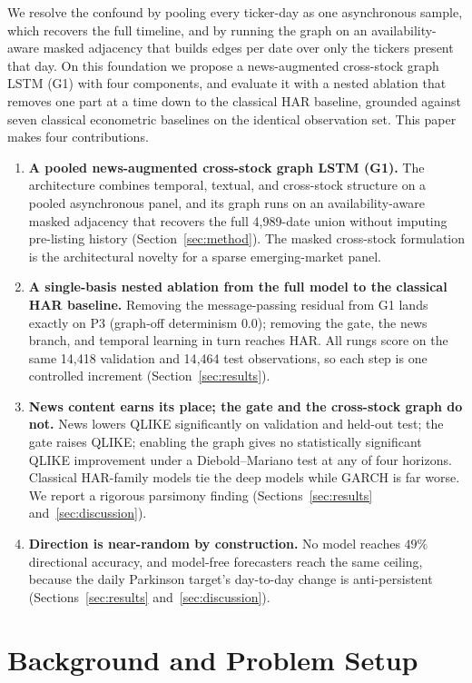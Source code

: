 \documentclass[runningheads]{llncs}
\newcommand{\nval}{14{,}418}
\newcommand{\ntest}{14{,}464}
\begin{document}
We resolve the confound by pooling every ticker-day as one asynchronous sample, which recovers the full
timeline, and by running the graph on an availability-aware masked adjacency that builds edges per date
over only the tickers present that day. On this foundation we propose a news-augmented cross-stock graph
LSTM (G1) with four components, and evaluate it with a nested ablation that removes one part at a time
down to the classical HAR baseline, grounded against seven classical econometric baselines on the
identical observation set. This paper makes four contributions.
\begin{enumerate}
\item \textbf{A pooled news-augmented cross-stock graph LSTM (G1).} The architecture combines temporal,
textual, and cross-stock structure on a pooled asynchronous panel, and its graph runs on an
availability-aware masked adjacency that recovers the full 4{,}989-date union without imputing
pre-listing history (Section~\ref{sec:method}). The masked cross-stock formulation is the architectural
novelty for a sparse emerging-market panel.
\item \textbf{A single-basis nested ablation from the full model to the classical HAR baseline.}
Removing the message-passing residual from G1 lands exactly on P3 (graph-off determinism $0.0$); removing
the gate, the news branch, and temporal learning in turn reaches HAR. All rungs score on the same \nval{}
validation and \ntest{} test observations, so each step is one controlled increment
(Section~\ref{sec:results}).
\item \textbf{News content earns its place; the gate and the cross-stock graph do not.} News lowers QLIKE
significantly on validation and held-out test; the gate raises QLIKE; enabling the graph gives no
statistically significant QLIKE improvement under a Diebold--Mariano test at any of four horizons.
Classical HAR-family models tie the deep models while GARCH is far worse. We report a rigorous parsimony
finding (Sections~\ref{sec:results} and~\ref{sec:discussion}).
\item \textbf{Direction is near-random by construction.} No model reaches $49\%$ directional accuracy,
and model-free forecasters reach the same ceiling, because the daily Parkinson target's day-to-day change
is anti-persistent (Sections~\ref{sec:results} and~\ref{sec:discussion}).
\end{enumerate}

\section{Background and Problem Setup}
\label{sec:background}
\end{document}
